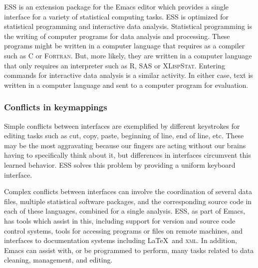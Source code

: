 \documentclass{article}
\newcommand*{\SAS}{\textsc{SAS}{\textregistered} }
\newcommand*{\XLispStat}{\textsc{XLispStat}}
\newcommand*{\Fortran}{\textsc{Fortran}}
\begin{document}
ESS is an extension package for
the Emacs editor which provides a single interface for a variety of
statistical computing tasks.  ESS is optimized for statistical programming
and interactive data analysis.  Statistical programming is the writing of
computer programs for data analysis and processing.  These programs might be
written in a computer language that requires as a compiler such as C or 
\Fortran.  But, more likely, they are written in a  computer
language that only requires an interpreter such as R, \SAS or \XLispStat.
Entering commands for interactive data analysis is a similar activity.
In either case, text is written in a computer language and sent to a
computer program for evaluation. 

\subsubsection{Conflicts in keymappings}
\label{sec:confl-keym}

Simple conflicts between interfaces are exemplified by different
keystrokes for editing tasks such as cut, copy, paste, beginning of
line, end of line, etc.  These may be the most aggravating
because our fingers are acting without our brains having to
specifically think about it, but differences in interfaces
circumvent this learned behavior.  ESS solves this problem by
providing a uniform keyboard interface.

Complex conflicts between interfaces can involve the coordination of
several data files, multiple statistical software packages, and the
corresponding source code in each of these languages, combined for a
single analysis.  ESS, as part of Emacs, has tools which assist in
this, including support for version and source code control systems,
tools for accessing programs or files on remote machines, and
interfaces to documentation systems including \LaTeX\ and
\textsc{xml}.  In addition, Emacs can assist with, or be programmed to
perform, many tasks related to data cleaning, management, and editing.
\end{document}
